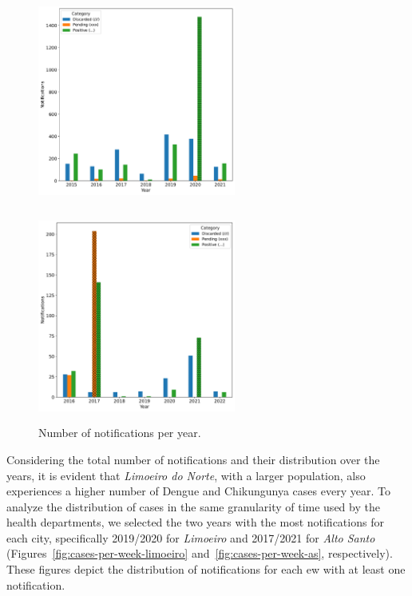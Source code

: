 \begin{figure}[h!]
\centering
  \begin{minipage}[c]{.45\textwidth}
    \centering
    \includegraphics[width=6.5cm, height=7cm]{images/cases-per-year-Limoeiro do Norte.pdf}
  \end{minipage}
  \hfill
  \begin{minipage}[c]{.45\textwidth}
    \centering
    \includegraphics[width=6.5cm, height=7cm]{images/cases-per-year-Alto Santo.pdf}
  \end{minipage}
  \caption{\label{fig:cases-per-year} Number of notifications per year.}
\end{figure}

Considering the total number of notifications and their distribution over the years, it is evident that \textit{Limoeiro do Norte}, with a larger population, also experiences a higher number of Dengue and Chikungunya cases every year. To analyze the distribution of cases in the same granularity of time used by the health departments, we selected the two years with the most notifications for each city, specifically 2019/2020 for \textit{Limoeiro} and 2017/2021 for \textit{Alto Santo} (Figures~\ref{fig:cases-per-week-limoeiro} and~\ref{fig:cases-per-week-as}, respectively). These figures depict the distribution of notifications for each \gls{ew} with at least one notification.
  
